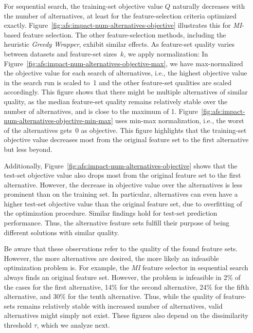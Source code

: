 \documentclass{article}
\theoremstyle{definition}
\begin{document}
For sequential search, the training-set objective value $Q$ naturally decreases with the number of alternatives, at least for the feature-selection criteria optimized exactly.
Figure~\ref{fig:afs:impact-num-alternatives-objective} illustrates this for \emph{MI}-based feature selection.
The other feature-selection methods, including the heuristic \emph{Greedy Wrapper}, exhibit similar effects.
As feature-set quality varies between datasets and feature-set sizes~$k$, we apply normalization:
In Figure~\ref{fig:afs:impact-num-alternatives-objective-max}, we have max-normalized the objective value for each search of alternatives, i.e., the highest objective value in the search run is scaled to~1 and the other feature-set qualities are scaled accordingly.
This figure shows that there might be multiple alternatives of similar quality, as the median feature-set quality remains relatively stable over the number of alternatives, and is close to the maximum of 1.
Figure~\ref{fig:afs:impact-num-alternatives-objective-min-max} uses min-max normalization, i.e., the worst of the alternatives gets~0 as objective.
This figure highlights that the training-set objective value decreases most from the original feature set to the first alternative but less beyond.

Additionally, Figure~\ref{fig:afs:impact-num-alternatives-objective} shows that the test-set objective value also drops most from the original feature set to the first alternative.
However, the decrease in objective value over the alternatives is less prominent than on the training set.
In particular, alternatives can even have a higher test-set objective value than the original feature set, due to overfitting of the optimization procedure.
Similar findings hold for test-set prediction performance.
Thus, the alternative feature sets fulfill their purpose of being different solutions with similar quality.

Be aware that these observations refer to the quality of the found feature sets.
However, the more alternatives are desired, the more likely an infeasible optimization problem is.
For example, the \emph{MI} feature selector in sequential search always finds an original feature set.
However, the problem is infeasible in 2\% of the cases for the first alternative, 14\% for the second alternative, 24\% for the fifth alternative, and 30\% for the tenth alternative.
Thus, while the quality of feature-sets remains relatively stable with increased number of alternatives, valid alternatives might simply not exist.
These figures also depend on the dissimilarity threshold $\tau$, which we analyze next.
\end{document}
